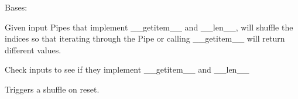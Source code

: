 \documentclass[letterpaper,10pt,english]{sphinxmanual}
\begin{document}
\begin{fulllineitems}
\label{\detokenize{Fireworks:Fireworks.toolbox.pipes.ShufflerPipe}}
Bases: {\hyperref[\detokenize{Fireworks:Fireworks.core.pipe.Pipe}]{}}

Given input Pipes that implement \_\_getitem\_\_ and \_\_len\_\_, will shuffle the indices so that iterating through
the Pipe or calling \_\_getitem\_\_ will return different values.

\begin{fulllineitems}
\label{\detokenize{Fireworks:Fireworks.toolbox.pipes.ShufflerPipe.check_input}}
Check inputs to see if they implement \_\_getitem\_\_ and \_\_len\_\_

\end{fulllineitems}


\begin{fulllineitems}
\label{\detokenize{Fireworks:Fireworks.toolbox.pipes.ShufflerPipe.shuffle}}
\end{fulllineitems}


\begin{fulllineitems}
\label{\detokenize{Fireworks:Fireworks.toolbox.pipes.ShufflerPipe.reset}}
Triggers a shuffle on reset.

\end{fulllineitems}


\end{fulllineitems}

\end{document}
